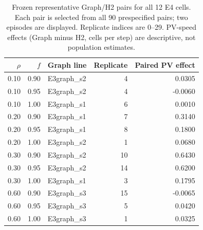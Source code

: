 \begin{table}[htbp]\centering
\caption{Frozen representative Graph/H2 pairs for all 12 E4 cells. Each pair is selected from all 90 prespecified pairs; two episodes are displayed. Replicate indices are 0--29. PV-speed effects (Graph minus H2, cells per step) are descriptive, not population estimates.}\label{tab:recorded-pairs}
\begin{tabular}{rrlrr}\hline
$\rho$ & $f$ & Graph line & Replicate & Paired PV effect \\\hline
0.10 & 0.90 & E3graph\_s2 & 4 & 0.0305 \\
0.10 & 0.95 & E3graph\_s2 & 4 & -0.0060 \\
0.10 & 1.00 & E3graph\_s1 & 6 & 0.0010 \\
0.20 & 0.90 & E3graph\_s1 & 7 & 0.3140 \\
0.20 & 0.95 & E3graph\_s1 & 8 & 0.1800 \\
0.20 & 1.00 & E3graph\_s2 & 1 & 0.0680 \\
0.30 & 0.90 & E3graph\_s2 & 10 & 0.6430 \\
0.30 & 0.95 & E3graph\_s2 & 14 & 0.6200 \\
0.30 & 1.00 & E3graph\_s1 & 3 & 0.1795 \\
0.60 & 0.90 & E3graph\_s3 & 15 & -0.0065 \\
0.60 & 0.95 & E3graph\_s3 & 5 & 0.0420 \\
0.60 & 1.00 & E3graph\_s3 & 1 & 0.0325 \\
\hline\end{tabular}
\end{table}
